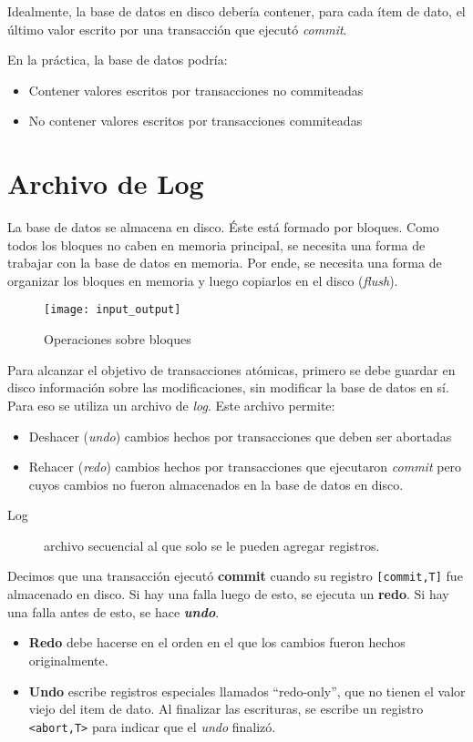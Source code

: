 \documentclass[a4paper, twoside]{article}
\begin{document}
Idealmente, la base de datos en disco debería contener, para cada ítem de dato, el último valor escrito por una transacción que ejecutó \emph{commit}.

En la práctica, la base de datos podría:
\begin{itemize}
	\item Contener valores escritos por transacciones no commiteadas
	\item No contener valores escritos por transacciones commiteadas
\end{itemize}

\section{Archivo de Log}
La base de datos se almacena en disco. Éste está formado por bloques. Como todos los bloques no caben en memoria principal, se necesita una forma de trabajar con la base de datos en memoria. Por ende, se necesita una forma de organizar los bloques en memoria y luego copiarlos en el disco (\emph{flush}).

\begin{figure}[H]
	\centering
	\texttt{[image: input\_output]}
	\caption{Operaciones sobre bloques}
\end{figure}

Para alcanzar el objetivo de transacciones atómicas, primero se debe guardar en disco información sobre las modificaciones, sin modificar la base de datos en sí. Para eso se utiliza un archivo de \emph{log}. Este archivo permite: 
\begin{itemize}
	\item Deshacer (\emph{undo}) cambios hechos por transacciones que deben ser abortadas
	\item Rehacer (\emph{redo}) cambios hechos por transacciones que ejecutaron
	\emph{commit} pero cuyos cambios no fueron almacenados en la base de datos en disco.
\end{itemize}

\begin{description}
	\item[Log] archivo secuencial al que solo se le pueden agregar registros.
\end{description}

Decimos que una transacción ejecutó \textbf{commit} cuando su registro \texttt{[commit,T]} fue almacenado en disco. Si hay una falla luego de esto, se ejecuta un \textbf{redo}. Si hay una falla antes de esto, se hace \textbf{\emph{undo}}.
\begin{itemize}
	\item \textbf{Redo} debe hacerse en el orden en el que los cambios fueron hechos originalmente.
	\item \textbf{Undo} escribe registros especiales llamados ``redo-only'', que no tienen el valor viejo del item de dato. Al finalizar las escrituras, se escribe un registro \texttt{<abort,T>} para indicar que el \emph{undo} finalizó.
\end{itemize}
\end{document}
